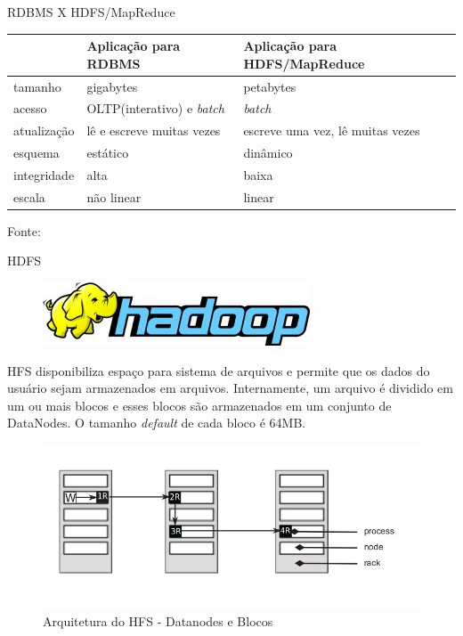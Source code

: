   \begin{frame}{RDBMS X HDFS/MapReduce}
{\small
        \begin{center}
          \begin{tabular}{|p{2cm}||p{3.5cm}||p{3.5cm}|}
            \hline
& Aplicação para RDBMS & Aplicação para HDFS/MapReduce\\ \hline
tamanho & gigabytes & petabytes\\ \hline
acesso & OLTP(interativo) e \emph{batch} & \emph{batch}\\ \hline
atualização & lê e escreve muitas vezes & escreve uma vez, lê muitas vezes\\ \hline
esquema & estático & dinâmico\\ \hline
integridade & alta & baixa\\ \hline
escala & não linear & linear\\ \hline
          \end{tabular}
        \end{center}
}

Fonte: \cite{White:2009}
  \end{frame}

  \begin{frame}{HDFS}

    \begin{figure}[hb]
      \centering
      \includegraphics[scale=2]{hadoop-logo.jpg}
    \end{figure}

HFS disponibiliza espaço para sistema de arquivos e permite que os dados do usuário sejam armazenados em arquivos. Internamente, um arquivo é dividido em um ou mais blocos e esses blocos são armazenados em um conjunto de DataNodes. O tamanho \emph{default} de cada bloco é 64MB.

    \begin{figure}[hb]
      \centering
      \includegraphics[scale=0.4]{HDFS-arquitetura-replicacao-2.jpg}
      \caption{Arquitetura do HFS - Datanodes e Blocos \cite{Hadoop:2010}}
      \label{fig7:hfs}
    \end{figure} 

  \end{frame}


